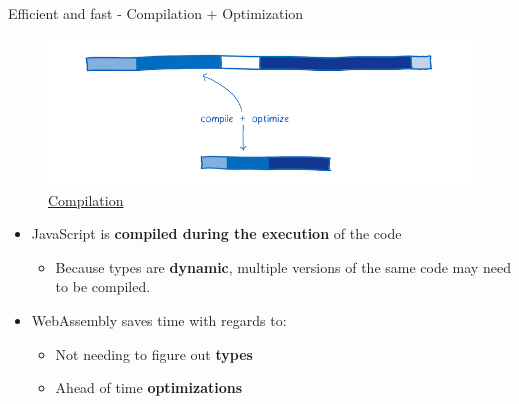\documentclass{beamer}
\begin{document}
\begin{frame}{Efficient and fast - Compilation + Optimization}
    \begin{figure}
        \includegraphics[scale=0.2]{./images/copyoptimize.png}
        \caption{\href{https://www.smashingmagazine.com/2017/05/abridged-cartoon-introduction-webassembly/}{Compilation}}
    \end{figure}
    \begin{itemize}
        \item JavaScript is \textbf{compiled during the execution} of the code
        \begin{itemize}
            \item Because types are \textbf{dynamic}, multiple versions of the same code may need to be compiled.
        \end{itemize}
        \item WebAssembly saves time with regards to:
              \begin{itemize}
                  \item Not needing to figure out \textbf{types}
                  \item Ahead of time \textbf{optimizations}
              \end{itemize}
    \end{itemize}
\end{frame}
\end{document}
